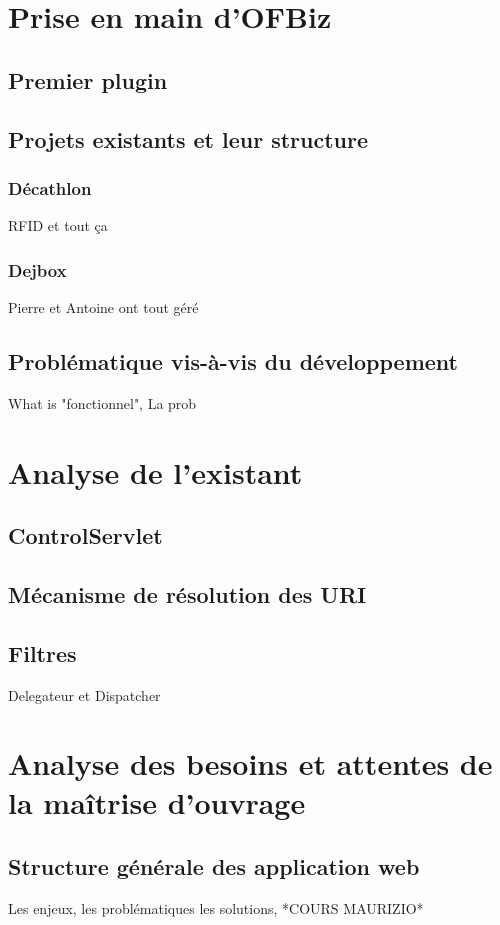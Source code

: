 \newpage
\section{Prise en main d'OFBiz}

\subsection{Premier plugin}

\subsection{Projets existants et leur structure}
\subsubsection{Décathlon}
RFID et tout ça
\subsubsection{Dejbox}
Pierre et Antoine ont tout géré 

\subsection{Problématique vis-à-vis du développement}
What is "fonctionnel", La prob

\newpage

\section{Analyse de l'existant}
\subsection{ControlServlet}
\subsection{Mécanisme de résolution des URI}
\subsection{Filtres}
Delegateur et Dispatcher


\newpage

\section{Analyse des besoins et attentes de la maîtrise d'ouvrage}
\subsection{Structure générale des application web}
Les enjeux, les problématiques les solutions, *COURS MAURIZIO*
